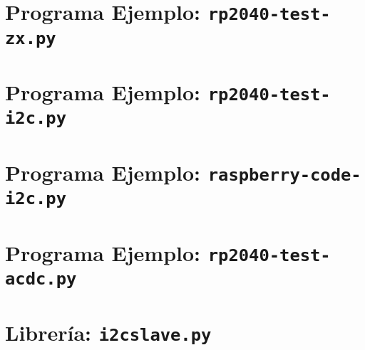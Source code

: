 %
%


\cleardoublepage
\section{Programa Ejemplo: \texttt{rp2040-test-zx.py}}%
\label{sec:appendix1}


\cleardoublepage
\section{Programa Ejemplo: \texttt{rp2040-test-i2c.py}}%
\label{sec:appendix3}


\cleardoublepage
\section{Programa Ejemplo: \texttt{raspberry-code-i2c.py}}%
\label{sec:appendix2}


\cleardoublepage
\section{Programa Ejemplo: \texttt{rp2040-test-acdc.py}}%
\label{sec:appendix4}


\cleardoublepage
\section{Librería: \texttt{i2cslave.py}}%
\label{sec:appendix5}
